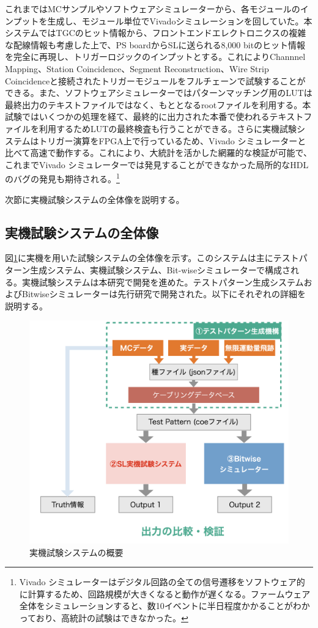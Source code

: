 これまではMCサンプルやソフトウェアシミュレーターから、各モジュールのインプットを生成し、モジュール単位でVivadoシミュレーションを回していた。本システムではTGCのヒット情報から、フロントエンドエレクトロニクスの複雑な配線情報も考慮した上で、PS boardからSLに送られる8,000 bitのヒット情報を完全に再現し、トリガーロジックのインプットとする。これによりChannnel Mapping、Station Coincidence、Segment Reconstruction、Wire Strip Coincidenceと接続されたトリガーモジュールをフルチェーンで試験することができる。また、ソフトウェアシミュレーターではパターンマッチング用のLUTは最終出力のテキストファイルではなく、もととなるrootファイルを利用する。本試験ではいくつかの処理を経て、最終的に出力された本番で使われるテキストファイルを利用するためLUTの最終検査も行うことができる。さらに実機試験システムはトリガー演算をFPGA上で行っているため、Vivado シミュレーターと比べて高速で動作する。これにより、大統計を活かした網羅的な検証が可能で、これまでVivado シミュレーターでは発見することができなかった局所的なHDLのバグの発見も期待される。\footnote{Vivado シミュレーターはデジタル回路の全ての信号遷移をソフトウェア的に計算するため、回路規模が大きくなると動作が遅くなる。ファームウェア全体をシミュレーションすると、数10イベントに半日程度かかることがわかっており、高統計の試験はできなかった。}

次節に実機試験システムの全体像を説明する。

\subsection{実機試験システムの全体像}
\label{subsec_TestSystemOverview}
図\ref{Test_system}に実機を用いた試験システムの全体像を示す。このシステムは主にテストパターン生成システム、実機試験システム、Bit-wiseシミュレーターで構成される。実機試験システムは本研究で開発を進めた。テストパターン生成システムおよびBitwiseシミュレーターは先行研究で開発された。以下にそれぞれの詳細を説明する。

\begin{figure} 
\centering
\includegraphics[width=16cm]{fig/Test/Test_system.png}
\caption[実機試験システムの概要]{実機試験システムの概要}
\label{Test_system}
\end{figure}

